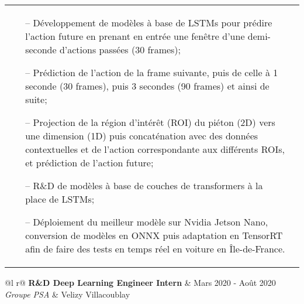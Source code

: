 \documentclass[a4paper,12pt]{article}
\begin{document}
\begin{tabularx}{\linewidth}{ @{}l r@{} }
{\begin{minipage}[t]{\linewidth}
\begin{itemize}[nosep,after=\strut, leftmargin=1em, itemsep=3pt]
        \item[--] Développement de modèles à base de LSTMs pour prédire l’action future en prenant en entrée une fenêtre d’une demi-seconde d’actions passées (30 frames);
        \item[--] Prédiction de l’action de la frame suivante, puis de celle à 1 seconde (30 frames), puis 3 secondes (90 frames) et ainsi de suite;
        \item[--] Projection de la région d’intérêt (ROI) du piéton (2D) vers une dimension (1D) puis concaténation avec des données contextuelles et de l’action correspondante aux différents ROIs, et prédiction de l’action future;
        \item[--] R\&D de modèles à base de couches de transformers à la place de LSTMs;
        \item[--] Déploiement du meilleur modèle sur Nvidia Jetson Nano, conversion de modèles en ONNX puis adaptation en TensorRT afin de faire des tests en temps réel en voiture en Île-de-France.
    \end{itemize}
    \end{minipage}
}
\end{tabularx}

\begin{tabularx}{\linewidth}{ @{}l r@{} }
\textbf{R\&D Deep Learning Engineer Intern} & \hfill Mars 2020 - Août 2020 \\
\textit{Groupe PSA} & \hfill Velizy Villacoublay \\[3.75pt]
\end{tabularx}
\end{document}
